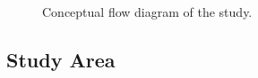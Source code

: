 \documentclass[
]{agujournal2019}
\begin{document}
\label{cell-fig-flow}
\begin{figure}[H]


\caption{\label{fig-flow}Conceptual flow diagram of the study.}

\end{figure}%

\subsection{Study Area}\label{sec-study}
\end{document}
